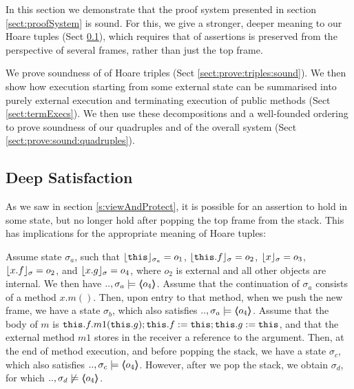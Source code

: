 

In this section we demonstrate that the proof system presented in section \ref{sect:proofSystem} is sound. 
For this, we give a stronger, deeper meaning to our Hoare tuples  (Sect \ref{s:deep:valid}), which requires that  of assertions is preserved from the perspective of several frames, rather than just the top frame.

We prove soundness of of Hoare triples (Sect \ref{sect:prove:triples:sound}).
We then show how execution starting from some external state can be summarised into purely external execution and terminating execution of public methods (Sect \ref{sect:termExecs}). We then use these decompositions and a well-founded ordering to prove soundness of our quadruples  and of the overall system (Sect \ref{sect:prove:sound:quadruples}).


\subsection{Deep Satisfaction} 
\label{s:deep:valid}

As we saw in section \ref{s:viewAndProtect}, it is possible  for an assertion to hold in some state,  but no longer hold after popping the top frame from the stack. 
This has implications for the appropriate meaning of Hoare tuples:

\begin{example}
\label{ex:motivate:deep}
Assume state $\sigma_a$, such that $\interpret {\sigma_a} {\prg{this}}=o_1$, $\interpret {\sigma} {\prg{this}.f}=o_2$, $\interpret {\sigma} {x}=o_3$, $\interpret {\sigma} {x.f}=o_2$,  
and $\interpret {\sigma} {x.g}=o_4$, where $o_2$ is external and all other objects are internal. 
We then have $..,\sigma_a \models  \inside {o_4}$.
Assume that the continuation of $\sigma_a$   consists of a method $x.m()$. Then,
upon entry to that method, when we push the new frame, we have a state $\sigma_b$, which also satisfies $..,\sigma_a \models  \inside {o_4}$.
Assume that the   body of $m$ is $\prg{this}.f.m1(\prg{this}.g); \prg{this}.f := \prg{this};  \prg{this}.g := \prg{this}$, and that the external method $m1$ stores in the 
receiver a reference to the argument.
Then, at the end of method execution, and before popping the stack, we have a state $\sigma_c$, which also satisfies $..,\sigma_c \models  \inside {o_4}$.
However, after we pop the stack, we obtain $\sigma_d$, for which $..,\sigma_d \not\models  \inside {o_4}$.
\end{example}
 

